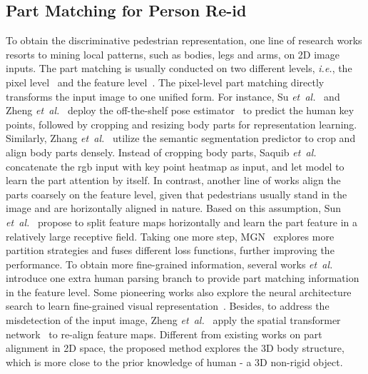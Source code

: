 \documentclass[journal]{IEEEtran}
\def\ie{\emph{i.e.}}
\def\etal{\emph{et~al.}}
\begin{document}
\subsection{Part Matching for Person Re-id}
To obtain the discriminative pedestrian representation, one line of research works resorts to mining local patterns, such as bodies, legs and arms, on 2D image inputs. The part matching is usually conducted on two different levels, \ie, the pixel level~\cite{su2017pose,zhang2019densely,zheng2019pose} and the feature level~\cite{sun2017beyond,wang2018learning,wu2020deep,hou2020iaunet}. 
The pixel-level part matching directly transforms the input image to one unified form. For instance, Su \etal~\cite{su2017pose} and Zheng \etal~\cite{zheng2019pose} deploy the off-the-shelf pose estimator~\cite{wei2016convolutional} to predict the human key points, followed by cropping and resizing body parts for representation learning. Similarly, Zhang \etal~\cite{zhang2019densely} utilize the semantic segmentation predictor to crop and align body parts densely. Instead of cropping body parts, Saquib \etal~\cite{saquib2018pose} concatenate the rgb input with key point heatmap as input, and let model to learn the part attention by itself.
In contrast, another line of works align the parts coarsely on the feature level, given that pedestrians usually stand in the image and are horizontally aligned in nature. Based on this assumption, Sun \etal~\cite{sun2017beyond,sun2019learning} propose to split feature 
maps horizontally and learn the part feature in a relatively large receptive field. Taking one more step, MGN~\cite{wang2018learning} explores more partition strategies and fuses different loss functions, further improving the performance. 
To obtain more fine-grained information, several works \etal~\cite{kalayeh2018human,suh2018part,gao2020pose,miao2019pose,lanmagnifiernet} introduce one extra human parsing branch to provide part matching information in the feature level. 
Some pioneering works also explore the neural architecture search to learn fine-grained visual representation~\cite{zhou2021attention,quan2019auto,ren2021comprehensive}. Besides, to address the misdetection of the input image, Zheng \etal~\cite{zheng2017pedestrian} apply the spatial transformer network~\cite{jaderberg2015spatial} to re-align feature maps. 
Different from existing works on part alignment in 2D space, the proposed method explores the 3D body structure, which is more close to the prior knowledge of human - a 3D non-rigid object. 
\end{document}

